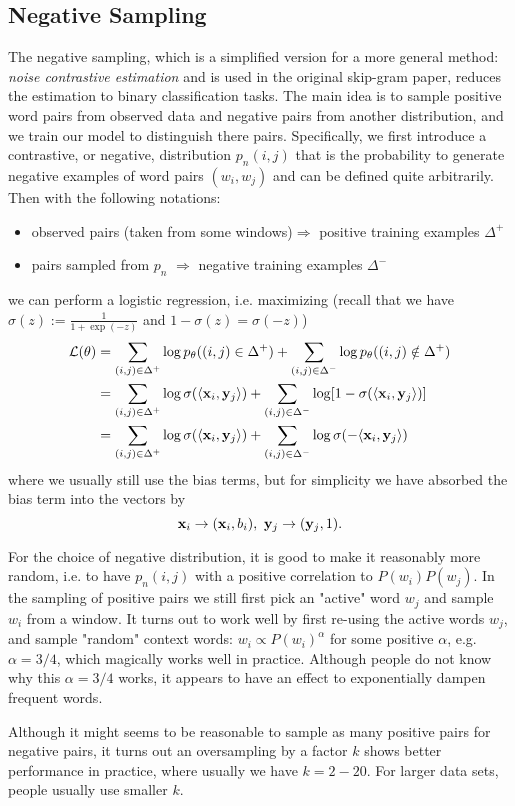 \documentclass[../book-template.tex]{subfiles}
\begin{document}
\subsection{Negative Sampling}
\par The negative sampling, which is a simplified version for a more general method: \emph{noise contrastive estimation} and is used in the original skip-gram paper, reduces the estimation to binary classification tasks. The main idea is to sample positive word pairs from observed data and negative pairs from another distribution, and we train our model to distinguish there pairs. Specifically, we first introduce a contrastive, or negative, distribution $p_n(i,j)$ that is the probability to generate negative examples of word pairs $(w_i,w_j)$ and can be defined quite arbitrarily. Then with the following notations:
\begin{itemize}
	\item observed pairs (taken from some windows)$\Longrightarrow$ positive training examples $\Delta^+$
	\item pairs sampled from $p_n$ $\Longrightarrow$ negative training examples $\Delta^-$
\end{itemize}
we can perform a logistic regression, i.e. maximizing (recall that we have $\sigma(z):=\frac{1}{1+\exp(-z)}$ and $1-\sigma(z)=\sigma(-z)$)
\begin{align}
	\mathcal{L}(\theta) &= \sum_{(i,j)\in \Delta^+} \log p_{\theta} ((i,j)\in\Delta^+) + \sum_{(i,j)\in \Delta^-} \log p_{\theta} ((i,j)\notin\Delta^+) \notag\\
	&=\sum_{(i,j)\in \Delta^+} \log \sigma(\langle {\bf x}_i, {\bf y}_j\rangle) +\sum_{(i,j)\in \Delta^-} \log [1-\sigma(\langle {\bf x}_i, {\bf y}_j\rangle)]\notag\\
	\label{eq_5_ns_lg}&=\sum_{(i,j)\in \Delta^+} \log \sigma(\langle {\bf x}_i, {\bf y}_j\rangle) +\sum_{(i,j)\in \Delta^-} \log \sigma(-\langle {\bf x}_i, {\bf y}_j\rangle)
\end{align}
where we usually still use the bias terms, but for simplicity we have absorbed the bias term into the vectors by
\begin{equation*}
	{\bf x}_i\rightarrow ({\bf x}_i, b_i),\ {\bf y}_j\rightarrow ({\bf y}_j, 1).
\end{equation*}
\par For the choice of negative distribution, it is good to make it reasonably more random, i.e. to have $p_n(i,j)$ with a positive correlation to $P(w_i)P(w_j)$. In the sampling of positive pairs we still first pick an "active" word $w_j$ and sample $w_i$ from a window. It turns out to work well by first re-using the active words $w_j$, and sample "random" context words: $w_i\propto P(w_i)^\alpha$ for some positive $\alpha$, e.g. $\alpha = 3/4$, which magically works well in practice. Although people do not know why this $\alpha = 3/4$ works, it appears to have an effect to exponentially dampen frequent words.
\par Although it might seems to be reasonable to sample as many positive pairs for negative pairs, it turns out an oversampling by a factor $k$ shows better performance in practice, where usually we have $k=2-20$. For larger data sets, people usually use smaller $k$.
\end{document}
